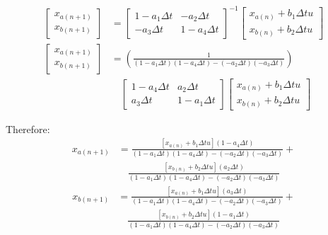 \documentclass[11pt]{article}
\begin{document}
\begin{subequations}
\begin{align}
\begin{bmatrix}
      x_{a(n+1)} \\
      x_{b(n+1)}
    \end{bmatrix} &=
    \begin{bmatrix}
      1 - a_1\Delta t & - a_2\Delta t \\
      - a_3\Delta t & 1 - a_4\Delta t
    \end{bmatrix} ^{-1}
    \begin{bmatrix}
      x_{a(n)} + b_1\Delta t u \\
      x_{b(n)} + b_2\Delta t u
    \end{bmatrix} \\
    \begin{bmatrix}
      x_{a(n+1)} \\
      x_{b(n+1)}
    \end{bmatrix} &=
    \left(\frac{1}{(1 - a_1\Delta t)(1 - a_4\Delta t) -(- a_2\Delta t)(- a_3\Delta t)}\right) \\ \nonumber
    &\quad
    \begin{bmatrix}
      1 - a_4\Delta t & a_2\Delta t \\
      a_3\Delta t & 1 - a_1\Delta t
    \end{bmatrix}
    \begin{bmatrix}
      x_{a(n)} + b_1\Delta t u \\
      x_{b(n)} + b_2\Delta t u
    \end{bmatrix}
  \end{align}
\end{subequations}

Therefore:
\begin{subequations}
  \begin{align}
    x_{a(n+1)} &= \frac{\left[x_{a(n)} + b_1\Delta t u\right](1 - a_4\Delta t)}{(1 - a_1\Delta t)(1 - a_4\Delta t) - (- a_2\Delta t)(- a_3\Delta t)} + \\ \nonumber
    &\quad \frac{\left[x_{b(n)} + b_2\Delta t u\right](a_2\Delta t)}{(1 - a_1\Delta t)(1 - a_4\Delta t) - (- a_2\Delta t)(- a_3\Delta t)}
  \end{align}
\end{subequations}
\begin{subequations}
  \begin{align}
    x_{b(n+1)} &= \frac{\left[x_{a(n)} + b_1\Delta t u\right](a_3\Delta t)}{(1 - a_1\Delta t)(1 - a_4\Delta t) - (- a_2\Delta t)(- a_3\Delta t)} + \\ \nonumber
    &\quad \frac{\left[x_{b(n)} + b_2\Delta t u\right](1 - a_1\Delta t)}{(1 - a_1\Delta t)(1 - a_4\Delta t) - (- a_2\Delta t)(- a_3\Delta t)}
  \end{align}
\end{subequations}
\end{document}
